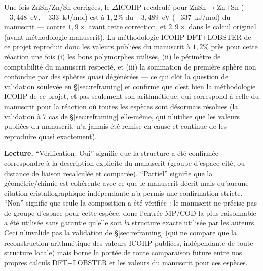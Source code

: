 Une fois ZnSn/Zn/Sn corrigées, le $\Delta$ICOHP recalculé pour
ZnSn$\to$Zn+Sn ($-3{,}448$~eV, $-333$~kJ/mol) est à $1,2\%$
du $-3{,}489$~eV ($-337$~kJ/mol) du manuscrit --- contre $1,9\times$
avant cette correction, et $2,9\times$ dans le calcul original
(avant méthodologie manuscrit). La méthodologie ICOHP DFT+LOBSTER de ce
projet reproduit donc les valeurs publiées du manuscrit à $1,2\%$ près
pour cette réaction une fois (i) les bons polymorphes utilisés, (ii) le
périmètre de comptabilité du manuscrit respecté, et (iii) la sommation
de première sphère non confondue par des sphères quasi dégénérées ---
ce qui clôt la question de validation soulevée en \S\ref{sec:reframing}
et confirme que c'est bien la méthodologie ICOHP de ce projet, et pas
seulement son arithmétique, qui correspond à celle du manuscrit pour la
réaction où toutes les espèces sont désormais résolues (la validation à
7 cas de \S\ref{sec:reframing} elle-même, qui n'utilise que les valeurs
publiées du manuscrit, n'a jamais été remise en cause et continue de
les reproduire quasi exactement).

\vspace{0.5em}
\noindent\textbf{Lecture.} ``Vérification: Oui'' signifie que la structure a été confirmée correspondre à la description explicite du manuscrit (groupe d'espace cité, ou distance de liaison recalculée et comparée). ``Partiel'' signifie que la géométrie/chimie est cohérente avec ce que le manuscrit décrit mais qu'aucune citation cristallographique indépendante n'a permis une confirmation stricte. ``Non'' signifie que seule la composition a été vérifiée : le manuscrit ne précise pas de groupe d'espace pour cette espèce, donc l'entrée MP/COD la plus raisonnable a été utilisée sans garantie qu'elle soit \emph{la} structure exacte utilisée par les auteurs. Ceci n'invalide pas la validation de \S\ref{sec:reframing} (qui ne compare que la reconstruction arithmétique des valeurs ICOHP publiées, indépendante de toute structure locale) mais borne la portée de toute comparaison future entre nos propres calculs DFT+LOBSTER et les valeurs du manuscrit pour ces espèces.
